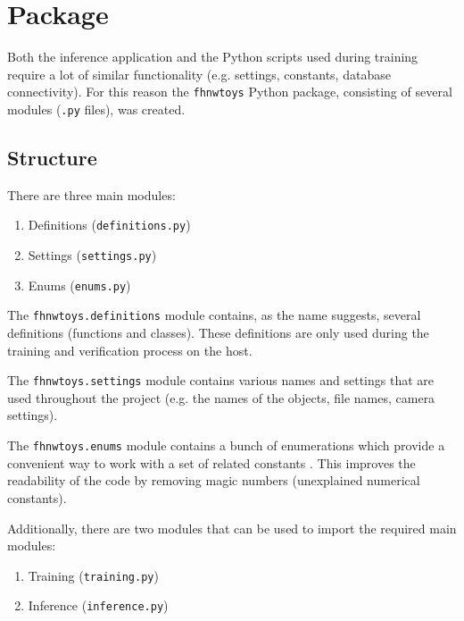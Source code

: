 \section{Package}
\label{sec:inference:package}

Both the inference application and the Python scripts used during training require a lot of similar functionality (e.g. settings, constants, database connectivity).
For this reason the \texttt{fhnwtoys} Python package, consisting of several modules (\texttt{.py} files), was created.

\subsection{Structure}
\label{subsec:inference:package:structure}
There are three main modules:
\begin{enumerate}
  \item Definitions (\texttt{definitions.py})
  \item Settings (\texttt{settings.py})
  \item Enums (\texttt{enums.py})
\end{enumerate}

The \texttt{fhnwtoys.definitions} module contains, as the name suggests, several definitions (functions and classes).
These definitions are only used during the training and verification process on the host.

The \texttt{fhnwtoys.settings} module contains various names and settings that are used throughout the project (e.g. the names of the objects, file names, camera settings).

The \texttt{fhnwtoys.enums} module contains a bunch of enumerations which provide a convenient way to work with a set of related constants \cite{}. %
This improves the readability of the code by removing magic numbers (unexplained numerical constants).

Additionally, there are two modules that can be used to import the required main modules:
\begin{enumerate}
  \item Training (\texttt{training.py})
  \item Inference (\texttt{inference.py})
\end{enumerate}

